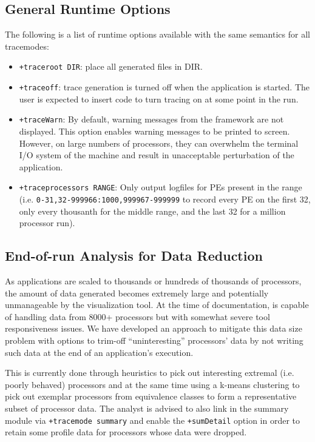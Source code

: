 \subsection{General Runtime Options}
\label{sec::general options}

The following is a list of runtime options available with the same
semantics for all tracemodes:

\begin{itemize}
\item
{\tt +traceroot DIR}: place all generated files in DIR.
\item
{\tt +traceoff}: trace generation is turned off when the application
is started. The user is expected to insert code to turn tracing on at
some point in the run.
\item
{\tt +traceWarn}: By default, warning messages from the framework are
not displayed. This option enables warning messages to be printed to
screen. However, on large numbers of processors, they can overwhelm
the terminal I/O system of the machine and result in unacceptable
perturbation of the application.
\item
{\tt +traceprocessors RANGE}: Only output logfiles for PEs present in the range (i.e. {\tt 0-31,32-999966:1000,999967-999999} to record every PE on the first 32, only every thousanth for the middle range, and the last 32 for a million processor run).

\end{itemize}

\subsection{End-of-run Analysis for Data Reduction}
\label{sec::data reduction}

As applications are scaled to thousands or hundreds of thousands of
processors, the amount of data generated becomes extremely large and
potentially unmanageable by the visualization tool. At the time of
documentation, \projections{} is capable of handling data from 8000+
processors but with somewhat severe tool responsiveness issues. We
have developed an approach to mitigate this data size problem with
options to trim-off ``uninteresting'' processors' data by not writing
such data at the end of an application's execution.

This is currently done through heuristics to pick out interesting
extremal (i.e. poorly behaved) processors and at the same time using a
k-means clustering to pick out exemplar processors from equivalence
classes to form a representative subset of processor data. The analyst
is advised to also link in the summary module via {\tt +tracemode
summary} and enable the {\tt +sumDetail} option in order to retain
some profile data for processors whose data were dropped.

